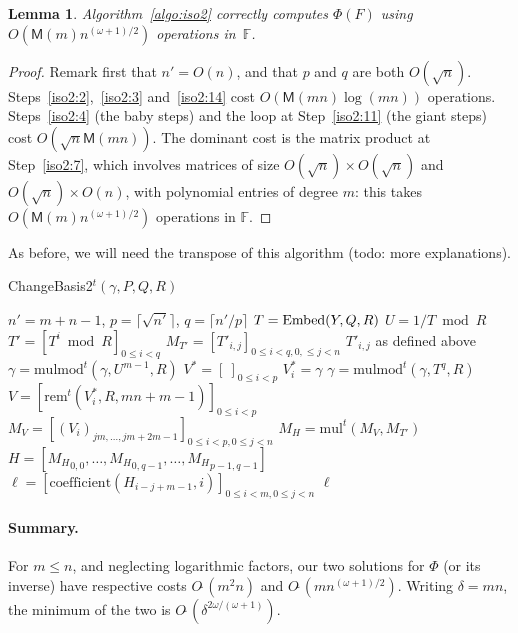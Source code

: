 \documentclass{sig-alternate}
\def\M {\ensuremath{\mathsf{M}}}
\def\F {\ensuremath{\mathbb{F}}}
\def\mul {\ensuremath{\mathrm{mul}}}
\def\rem {\ensuremath{\mathrm{rem}}}
\def\coeff {\ensuremath{\mathrm{coefficient}}}
\def\mulmod {\ensuremath{\mathrm{mulmod}}}
\newtheorem{Lemma}{Lemma}
\begin{document}
\begin{Lemma}
  Algorithm~\ref{algo:iso2} correctly computes $\Phi(F)$ using
  $O(\M(m) n^{(\omega+1)/2} )$ operations in~$\F$.
\end{Lemma}
\begin{proof}
  Remark first that $n'=O(n)$, and that $p$ and $q$ are both
  $O(\sqrt{n})$. Steps~\ref{iso2:2},~\ref{iso2:3} and~\ref{iso2:14}
  cost $O(\M(mn)\log(mn))$ operations. Steps~\ref{iso2:4} (the baby
  steps) and the loop at Step~\ref{iso2:11} (the giant steps) cost
  $O(\sqrt{n}\M(mn))$. The dominant cost is the matrix product at
  Step~\ref{iso2:7}, which involves matrices of size $O(\sqrt{n})
  \times O(\sqrt{n})$ and $O(\sqrt{n}) \times O(n)$, with polynomial
  entries of degree $m$: this takes $O(\M(m) n^{(\omega+1)/2})$ 
  operations in $\F$.
\end{proof}

As before, we will need the transpose of this algorithm (todo: more
explanations).
\begin{algorithm}[H]
  \caption{ChangeBasis2$^t(\gamma,P,Q,R)$}
  \begin{algorithmic}[1]
    \STATE $n'=m+n-1$, $p=\lceil \sqrt {n'} \rceil$, $q=\lceil n'/p\rceil$
    \STATE $T={\rm Embed}(Y,Q,R)$
    \STATE $U=1/T \bmod R$
    \STATE $T'=[T^i \bmod R]_{0 \le i < q}$
    \STATE $M_{T'}=[T'_{i,j}]_{0\le i < q, 0, \le j < n}$ \hfill $T'_{i,j}$ as defined above
    \STATE $\gamma = \mulmod^t(\gamma, U^{m-1}, R)$
    \STATE $V^*=[\ ]_{0 \le i < p}$
    \STATE $V^*_i = \gamma$
    \STATE $\gamma = \mulmod^t(\gamma,T^q,R)$
    \ENDFOR
    \STATE $V = [\rem^t(V^*_i,R,mn+m-1)]_{0 \le i < p}$
    \STATE $M_V = [(V_{i})_{jm,\dots,jm+2m-1}]_{0 \le i < p, 0 \le j < n}$
    \STATE $M_H = \mul^t(M_V, M_{T'})$
    \STATE $H=[{M_H}_{0,0},\dots,{M_H}_{0,q-1},\dots,{M_H}_{p-1,q-1}]$
    \STATE $\ell=[\coeff(H_{i-j+m-1},i)]_{0 \le i < m, 0 \le j < n}$
    \RETURN $\ell$
  \end{algorithmic}
  \label{algo:tiso2}
\end{algorithm}


\paragraph{Summary.} For $m \le n$, and neglecting logarithmic factors,
our two solutions for $\Phi$ (or its inverse) have respective costs
$O\tilde{~}(m^2 n)$ and $O\tilde{~}(m n^{(\omega+1)/2})$. Writing
$\delta=mn$, the minimum of the two is
$O\tilde{~}(\delta^{2\omega/(\omega+1)})$.
\end{document}
